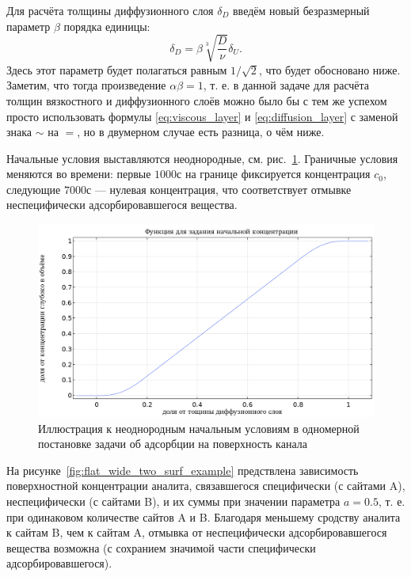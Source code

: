 \documentclass[oneside,final,12pt]{extreport}
\begin{document}
Для расчёта толщины диффузионного слоя $\delta_D$ введём новый безразмерный
параметр $\beta$ порядка единицы:
\begin{equation}
  \delta_D = \beta\sqrt[3]{\frac{D}{\nu}} \delta_U.
  \label{eq:diffusion_layer_beta}
\end{equation}
Здесь этот параметр будет полагаться равным $1/\sqrt{2}$, что будет обосновано ниже.
Заметим, что тогда произведение $\alpha\beta = 1$, т. е.
в данной задаче для расчёта толщин вязкостного и диффузионного слоёв
можно было бы с тем же успехом просто использовать формулы
\eqref{eq:viscous_layer} и \eqref{eq:diffusion_layer}
с заменой знака $\sim$ на $=$,
но в двумерном случае есть разница, о чём ниже.

Начальные условия выставляются неоднородные,
см. рис.~\ref{fig:flat_wide_ramp_ic}.
Граничные условия меняются во времени: первые $1000\text{с}$
на границе фиксируется концентрация $c_0$,
следующие $7000\text{с}$ --- нулевая концентрация, что соответствует отмывке
неспецифически адсорбировавшегося вещества.

\begin{figure}
  \centering
  \includegraphics[width=.7\textwidth]{pic/wide_two_surf_ramp}
  
  \caption{%
    \label{fig:flat_wide_ramp_ic}%
    Иллюстрация к неоднородным начальным условиям в одномерной постановке
    задачи об адсорбции на поверхность канала
  }

\end{figure}

На рисунке~\ref{fig:flat_wide_two_surf_example} предствлена зависимость
поверхностной концентрации аналита, связавшегося специфически (с сайтами A),
неспецифически (с сайтами B), и их суммы при значении параметра $a = 0.5$,
т. е. при одинаковом количестве сайтов A и B.
Благодаря меньшему сродству аналита к сайтам B, чем к сайтам A, отмывка
от неспецифически адсорбировавшегося вещества возможна
(с сохранием значимой части специфически адсорбировавшегося).
\end{document}
